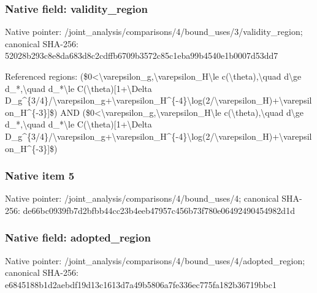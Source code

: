 \documentclass[10pt,a4paper]{article}
\begin{document}
\subsubsection{Native field: validity\_\allowbreak{}region}
Native pointer: /joint\_\allowbreak{}analysis/comparisons/4/bound\_\allowbreak{}uses/3/validity\_\allowbreak{}region; canonical SHA-256: 52028b293c8e8da683d8c2cdffb6709b3572c85c1eba99b4540e1b0007d53dd7

\begingroup\raggedright\sloppy Referenced regions:\allowbreak{} (\$0<\textbackslash{}varepsilon\_\allowbreak{}g,\allowbreak{}\textbackslash{}varepsilon\_\allowbreak{}H\textbackslash{}le c(\textbackslash{}theta),\allowbreak{}\textbackslash{}quad d\textbackslash{}ge d\_\allowbreak{}*,\allowbreak{}\textbackslash{}quad d\_\allowbreak{}*\textbackslash{}le C(\textbackslash{}theta)[1+\textbackslash{}Delta D\_\allowbreak{}g\textasciicircum{}\{3/\allowbreak{}4\}/\allowbreak{}\textbackslash{}varepsilon\_\allowbreak{}g+\textbackslash{}varepsilon\_\allowbreak{}H\textasciicircum{}\{-4\}\textbackslash{}log(2/\allowbreak{}\textbackslash{}varepsilon\_\allowbreak{}H)+\textbackslash{}varepsilon\_\allowbreak{}H\textasciicircum{}\{-3\}]\$) AND (\$0<\textbackslash{}varepsilon\_\allowbreak{}g,\allowbreak{}\textbackslash{}varepsilon\_\allowbreak{}H\textbackslash{}le c(\textbackslash{}theta),\allowbreak{}\textbackslash{}quad d\textbackslash{}ge d\_\allowbreak{}*,\allowbreak{}\textbackslash{}quad d\_\allowbreak{}*\textbackslash{}le C(\textbackslash{}theta)[1+\textbackslash{}Delta D\_\allowbreak{}g\textasciicircum{}\{3/\allowbreak{}4\}/\allowbreak{}\textbackslash{}varepsilon\_\allowbreak{}g+\textbackslash{}varepsilon\_\allowbreak{}H\textasciicircum{}\{-4\}\textbackslash{}log(2/\allowbreak{}\textbackslash{}varepsilon\_\allowbreak{}H)+\textbackslash{}varepsilon\_\allowbreak{}H\textasciicircum{}\{-3\}]\$)\par\endgroup

\subsubsection{Native item 5}
Native pointer: /joint\_\allowbreak{}analysis/comparisons/4/bound\_\allowbreak{}uses/4; canonical SHA-256: de66bc0939fb7d2bfbb44cc23b4eeb47957c456b73f780e06492490454982d1d

\subsubsection{Native field: adopted\_\allowbreak{}region}
Native pointer: /joint\_\allowbreak{}analysis/comparisons/4/bound\_\allowbreak{}uses/4/adopted\_\allowbreak{}region; canonical SHA-256: e6845188b1d2aebdf19d13c1613d7a49b5806a7fe336ec775fa182b36719bbc1
\end{document}
